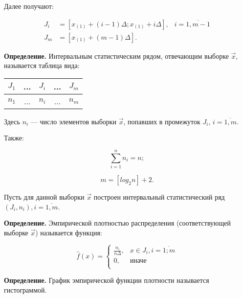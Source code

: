Далее получают:

\begin{equation}\label{eq:07}
    \begin{aligned}
        J_i &= [x_{(1)} + (i - 1) \Delta; x_{(1)} + i \Delta],
        & i = \overline{1, m-1}\\
        J_m &= [x_{(1)} + (m - 1) \Delta].
    \end{aligned}
\end{equation}

\textbf{Определение.} Интервальным статистическим рядом, отвечающим
выборке $\vec{x}$, называется таблица вида:

\begin{table}[htb]
    \centering
    \begin{tabular}{|c|c|c|c|c|}
        \hline
        $J_1$ & ... & $J_i$ & ... & $J_m$ \\
        \hline
        $n_1$ & ... & $n_i$ & ... & $n_m$ \\
        \hline
    \end{tabular}
\end{table}

Здесь $n_i$ --- число элементов выборки $\vec{x}$, попавших в промежуток $J_i$,
$i= \overline{1,m}$.

Также:

\begin{equation}\label{eq:08}
    \sum_{i=1}^{n} n_i = n;
\end{equation}

\begin{equation}\label{eq:09}
    m = [log_2 n] + 2.
\end{equation}

Пусть для данной выборки $\vec{x}$ построен интервальный статистический
ряд~$(J_i, n_i), i=\overline{1,m}$.

\textbf{Определение.} Эмпирической плотностью распределения (соответствующей
выборке $\vec{x}$) называется функция:

\begin{equation}
    \hat f(x) =
    \begin{cases}
        \frac{n_i}{n \Delta}, &x \in J_i, i = \overline{1; m} \\
        0, &\text{иначе} \\
    \end{cases}
\end{equation}

\textbf{Определение.} График эмпирической функции плотности называется
гистограммой.

